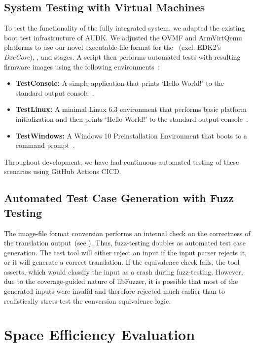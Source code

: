 \subsection{System Testing with Virtual Machines}

To test the functionality of the fully integrated system, we adapted the existing boot test infrastructure of \gls{AUDK}. We adjusted the \gls{OVMF} and \gls{ArmVirtQemu} platforms to use our novel \gls{executable-file} format for the ~(excl. \gls{EDK2}'s \textit{DxeCore}), , and  stages. A script then performs automated tests with resulting \gls{firmware} \glspl{image} using the following environments~\cite{ocbuild}:
\begin{itemize}
  \item \textbf{TestConsole:} A simple  application that prints `Hello World!' to the standard output console~\cite{ocbuild}.
  \item \textbf{TestLinux:} A minimal Linux 6.3 environment that performs basic platform initialization and then prints `Hello World!' to the standard output console~\cite{ocbuild}.
  \item \textbf{TestWindows:} A Windows 10 Preinstallation Environment that boots to a command prompt~\cite{ocbinarydata-winpe}.
\end{itemize}

Throughout development, we have had continuous automated testing of these scenarios using GitHub Actions \gls{CICD}.

\subsection{Automated Test Case Generation with Fuzz Testing}

The \gls{image-file} format conversion performs an internal check on the correctness of the translation output~(see ). Thus, \gls{fuzz-testing} doubles as automated test case generation. The test tool will either reject an input if the input parser rejects it, or it will generate a correct translation. If the equivalence check fails, the tool asserts, which would classify the input as a crash during \gls{fuzz-testing}. However, due to the coverage-guided nature of libFuzzer, it is possible that most of the generated inputs were invalid and therefore rejected much earlier than to realistically stress-test the conversion equivalence logic.

\section{Space Efficiency Evaluation}
\label{sec:space_eff_val}

